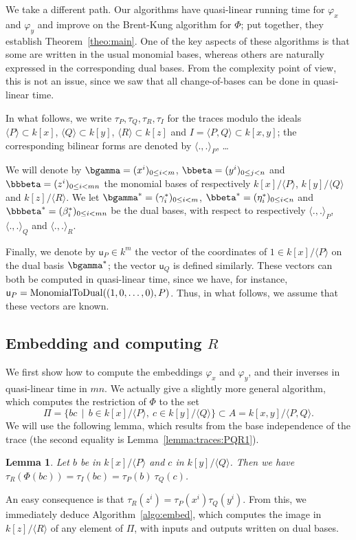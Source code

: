 \documentclass{sig-alternate}
\def\vu {\ensuremath{\mathsf{u}}}
\newcounter{algo}
\newcommand{\ang}[1]{\langle#1\rangle}
\newtheorem{Lemma}{Lemma}
\begin{document}
We take a different path. Our algorithms have quasi-linear running
time for $\varphi_x$ and $\varphi_y$ and improve on the Brent-Kung
algorithm for $\Phi$; put together, they establish
Theorem~\ref{theo:main}. One of the key aspects of these algorithms is
that some are written in the usual monomial bases, whereas others are
naturally expressed in the corresponding dual bases. From the
complexity point of view, this is not an issue, since we saw that all
change-of-bases can be done in quasi-linear time.

In what follows, we write $\tau_P,\tau_Q,\tau_R,\tau_I$ for the traces
modulo the ideals $\ang{P}\subset k[x]$, $\ang{Q} \subset k[y]$,
$\ang{R} \subset k[z]$ and $I=\ang{P,Q} \subset k[x,y]$; the
corresponding bilinear forms are denoted by $\ang{.,.}_P$, \dots

We will denote by $\bgamma=(x^i)_{0 \le i < m}$, $\bbeta=(y^i)_{0 \le
  j < n}$ and $\bbbeta = (z^i)_{0 \le i < mn}$ the monomial bases of
respectively $k[x]/\ang{P}$, $k[y]/\ang{Q}$ and $k[z]/\ang{R}$. We let
$\bgamma^\ast=(\gamma^\ast_i)_{0 \le i <m}$,
$\bbeta^\ast=(\eta^\ast_i)_{0 \le i < n}$ and
$\bbbeta^\ast=(\beta^\ast_i)_{0 \le i < mn}$ be the dual bases, with
respect to respectively $\ang{.,.}_P$, $\ang{.,.}_Q$ and
$\ang{.,.}_R$.

Finally, we denote by $\vu_P \in k^m$ the vector of the coordinates of
$1 \in k[x]/\ang{P}$ on the dual basis $\bgamma^\ast$; the vector
$\vu_Q$ is defined similarly. These vectors can both be computed in
quasi-linear time, since we have, for instance, $\vu_P = {\rm
  MonomialToDual}((1,0,\dots,0), P)$. Thus, in what follows, we assume
that these vectors are known.


\subsection{Embedding and computing $R$} 

We first show how to compute the embeddings $\varphi_x$ and
$\varphi_y$, and their inverses in quasi-linear time in $mn$. We
actually give a slightly more general algorithm, which computes the
restriction of $\Phi$ to the set $$\Pi= \{bc \,\mid\, b\in
k[x]/\ang{P},\ c\in k[y]/\ang{Q}\} \subset A=k[x,y]/\ang{P,Q}.$$ We
will use the following lemma, which results from the base independence
of the trace (the second equality is Lemma~\ref{lemma:traces:PQR1}).
\begin{Lemma}
  \label{lemma:traces:PQR}
  Let $b$ be in $k[x]/\ang{P}$ and $c$ in $k[y]/\ang{Q}$. Then we have
  $\tau_R(\Phi(bc)) = \tau_I(bc) = \tau_P(b) \ \tau_Q(c)$.
\end{Lemma}
An easy consequence is that $\tau_R(z^i) =
\tau_P(x^i)\tau_Q(y^i)$. From this, we immediately deduce
Algorithm~\ref{algo:embed}, which computes the image in $k[z]/\ang{R}$
of any element of $\Pi$, with inputs and outputs written on dual
bases.
\end{document}

